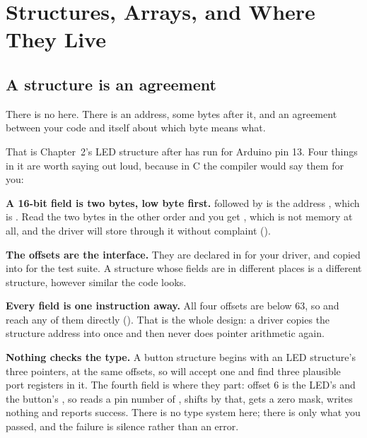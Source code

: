 
\section{Structures, Arrays, and Where They Live}
\label{c4:sec:structures}

\subsection{A structure is an agreement}
\label{c4:sec:agreement}
There is no  here. There is an address, some bytes after it, and an agreement between
your code and itself about which byte means what.


That is Chapter~2's LED structure after  has run for Arduino pin 13. Four things in
it are worth saying out loud, because in C the compiler would say them for you:

\textbf{A 16-bit field is two bytes, low byte first.}  followed by  is the
address , which is . Read the two bytes in the other order and you get
, which is not memory at all, and the driver will store through it without complaint
().

\textbf{The offsets are the interface.} They are declared in  for
your driver, and copied into  for the test suite. A structure
whose fields are in different places is a different structure, however similar the code looks.

\textbf{Every field is one instruction away.} All four offsets are below 63, so  and
 reach any of them directly (). That is the whole design: a
driver copies the structure address into  once and then never does pointer arithmetic
again.

\textbf{Nothing checks the type.} A button structure begins with an LED structure's three
pointers, at the same offsets, so  will accept one and find three plausible port
registers in it. The fourth field is where they part: offset 6 is the LED's  and the
button's , so  reads a pin number of , shifts by that, gets
a zero mask, writes nothing and reports success. There is no type system here; there is only what
you passed, and the failure is silence rather than an error.

